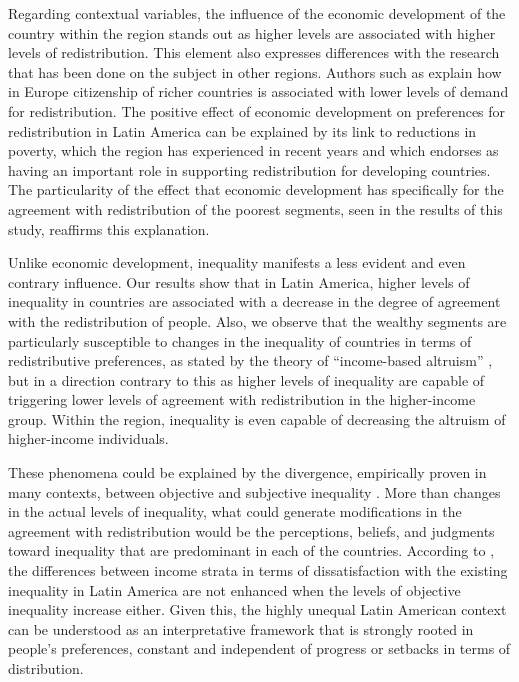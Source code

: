 \documentclass[utf8]{frontiersSCNS} %
\begin{document}
Regarding contextual variables, the influence of the economic development of the country within the region stands out as higher levels are associated with higher levels of redistribution. This element also expresses differences with the research that has been done on the subject in other regions. Authors such as \textcite{Schmidt-CatranEconomicinequalitypublic2016} explain how in Europe citizenship of richer countries is associated with lower levels of demand for redistribution. The positive effect of economic development on preferences for redistribution in Latin America can be explained by its link to reductions in poverty, which the region has experienced in recent years \parencite{birdsall2013some, Dayton-Johnson2015} and which \textcite{wietzke2016kicking} endorses as having an important role in supporting redistribution for developing countries. The particularity of the effect that economic development has specifically for the agreement with redistribution of the poorest segments, seen in the results of this study, reaffirms this explanation.

Unlike economic development, inequality manifests a less evident and even contrary influence. Our results show that in Latin America, higher levels of inequality in countries are associated with a decrease in the degree of agreement with the redistribution of people. Also, we observe that the wealthy segments are particularly susceptible to changes in the inequality of countries in terms of redistributive preferences, as stated by the theory of “income-based altruism” \parencite{Dimick2016, Dimick2018}, but in a direction contrary to this as higher levels of inequality are capable of triggering lower levels of agreement with redistribution in the higher-income group. Within the region, inequality is even capable of decreasing the altruism of higher-income individuals.

These phenomena could be explained by the divergence, empirically proven in many contexts, between objective and subjective inequality \parencite{Castillolegitimacyeconomicinequality2010, Sachwehwelfarestateequality2010, mijs2019paradox}. More than changes in the actual levels of inequality, what could generate modifications in the agreement with redistribution would be the perceptions, beliefs, and judgments toward inequality \parencite{janmaat2013subjective} that are predominant in each of the countries. According to \textcite{CramerViewsEconomicInequality2011}, the differences between income strata in terms of dissatisfaction with the existing inequality in Latin America are not enhanced when the levels of objective inequality increase either. Given this, the highly unequal Latin American context can be understood as an interpretative framework that is strongly rooted in people’s preferences, constant and independent of progress or setbacks in terms of distribution.
\end{document}
